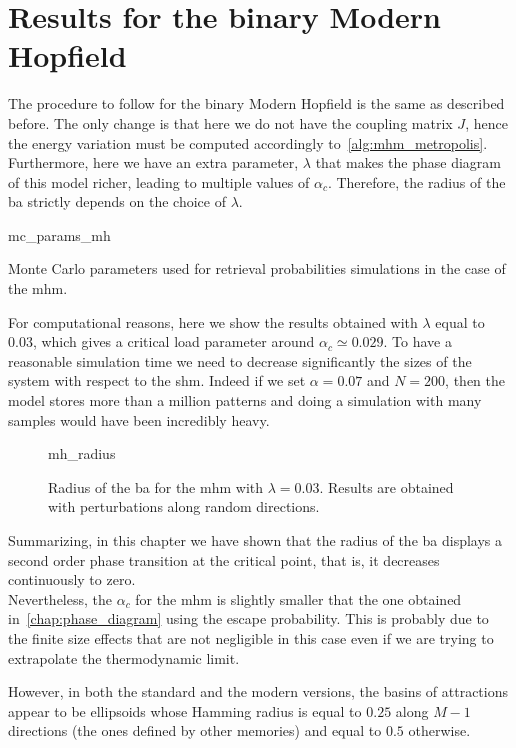 \documentclass[\rootdir/main.tex]{subfiles}
\begin{document}
\section{Results for the binary Modern Hopfield}
The procedure to follow for the binary Modern Hopfield is the same as described before. The only change is that here we do not have the coupling matrix $J$, hence the energy variation must be computed accordingly to~\cref{alg:mhm_metropolis}.
Furthermore, here we have an extra parameter, $\lambda$ that makes the phase diagram of this model richer, leading to multiple values of $\alpha_c$. Therefore, the radius of the \acrlong{ba} strictly depends on the choice of $\lambda$.
\begin{table}[hbt]
    \centering
    {mc_params_mh}
    \caption{Monte Carlo parameters used for retrieval probabilities simulations in the case of the \acrlong{mhm}.}
    \label{tab:my_label}
\end{table}
For computational reasons, here we show the results obtained with $\lambda$ equal to $0.03$, which gives a critical load parameter around $\alpha_c \simeq 0.029$. To have a reasonable simulation time we need to decrease significantly the sizes of the system with respect to the \acrlong{shm}. Indeed if we set $\alpha = 0.07$ and $N = 200$, then the model stores more than a million patterns and doing a simulation with many samples would have been incredibly heavy. 

\begin{figure}[hbt]
    \centering
    {mh_radius}
    \caption{Radius of the \acrlong{ba} for the \acrlong{mhm} with $\lambda = 0.03$. Results are obtained with perturbations along random directions.}
    \label{fig:mh:radius}
\end{figure}

Summarizing, in this chapter we have shown that the radius of the \acrlong{ba} displays a second order phase transition at the critical point, that is, it decreases continuously to zero.\\
Nevertheless, the $\alpha_c$ for the \acrlong{mhm} is slightly smaller that the one obtained in~\cref{chap:phase_diagram} using the escape probability. This is probably due to the finite size effects that are not negligible in this case even if we are trying to extrapolate the thermodynamic limit. 

However, in both the standard and the modern versions, the basins of attractions appear to be ellipsoids whose Hamming radius is equal to $0.25$ along $M - 1$ directions (the ones defined by other memories) and equal to $0.5$ otherwise.
\clearpage
\end{document}
